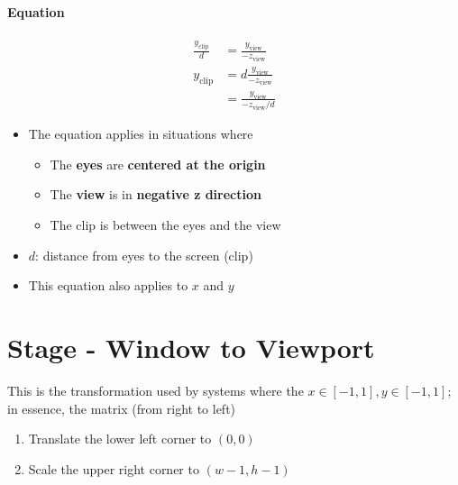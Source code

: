     \paragraph{Equation}
    \begin{align}
      \frac{y_{\text{clip}}}{d} &= \frac{y_{\text{view}}}{-z_{\text{view}}} \\
      y_{\text{clip}}
      &= d\frac{y_ {\text{view}}}{-z_{\text{view}}} \\
      &= \frac{y_{\text{view}}}{-z_{\text{view}} / d}
    \end{align}

    \begin{itemize}
      \item The equation applies in situations where
      \begin{itemize}
        \item The \textbf{eyes} are \textbf{centered at the origin}
        \item The \textbf{view} is in \textbf{negative z direction}
        \item The clip is between the eyes and the view
      \end{itemize}

      \item $ d $: distance from eyes to the screen (clip)
      \item This equation also applies to $ x $ and $ y $
    \end{itemize}

\section{Stage - Window to Viewport}

  This is the transformation used by systems where the
  $ x \in \left[ -1, 1 \right], y \in \left[ -1, 1 \right] $; in essence,
  the matrix (from right to left)

  \begin{enumerate}
    \item Translate the lower left corner to $ \left( 0, 0 \right) $
    \item Scale the upper right corner to $ \left( w - 1, h - 1 \right) $
  \end{enumerate}

